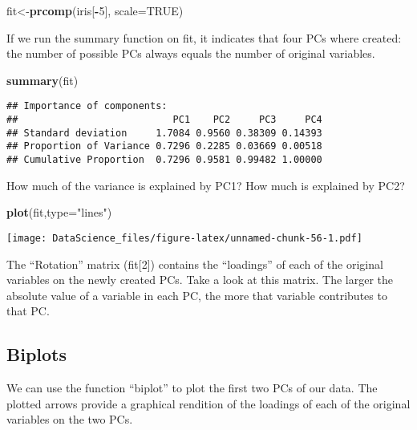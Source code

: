 \documentclass[
]{book}
\newenvironment{Shaded}{\begin{snugshade}}{\end{snugshade}}
\newcommand{\DataTypeTok}[1]{\textcolor[rgb]{0.13,0.29,0.53}{#1}}
\newcommand{\DecValTok}[1]{\textcolor[rgb]{0.00,0.00,0.81}{#1}}
\newcommand{\KeywordTok}[1]{\textcolor[rgb]{0.13,0.29,0.53}{\textbf{#1}}}
\newcommand{\NormalTok}[1]{#1}
\newcommand{\OperatorTok}[1]{\textcolor[rgb]{0.81,0.36,0.00}{\textbf{#1}}}
\newcommand{\OtherTok}[1]{\textcolor[rgb]{0.56,0.35,0.01}{#1}}
\newcommand{\StringTok}[1]{\textcolor[rgb]{0.31,0.60,0.02}{#1}}
\begin{document}
\begin{Shaded}
\begin{Highlighting}[]
\NormalTok{fit\textless{}{-}}\KeywordTok{prcomp}\NormalTok{(iris[}\OperatorTok{{-}}\DecValTok{5}\NormalTok{], }\DataTypeTok{scale=}\OtherTok{TRUE}\NormalTok{)}
\end{Highlighting}
\end{Shaded}

If we run the summary function on fit, it indicates that four PCs where created: the number
of possible PCs always equals the number of original variables.

\begin{Shaded}
\begin{Highlighting}[]
\KeywordTok{summary}\NormalTok{(fit)}
\end{Highlighting}
\end{Shaded}

\begin{verbatim}
## Importance of components:
##                           PC1    PC2     PC3     PC4
## Standard deviation     1.7084 0.9560 0.38309 0.14393
## Proportion of Variance 0.7296 0.2285 0.03669 0.00518
## Cumulative Proportion  0.7296 0.9581 0.99482 1.00000
\end{verbatim}

How much of the variance is explained by PC1? How much is explained by PC2?

\begin{Shaded}
\begin{Highlighting}[]
\KeywordTok{plot}\NormalTok{(fit,}\DataTypeTok{type=}\StringTok{"lines"}\NormalTok{)}
\end{Highlighting}
\end{Shaded}

\texttt{[image: DataScience\_files/figure-latex/unnamed-chunk-56-1.pdf]}

The ``Rotation'' matrix (fit{[}2{]}) contains the ``loadings'' of each of the original variables on the newly created PCs. Take a look at this matrix. The larger the absolute value of a variable in each PC, the more that variable contributes to that PC.

\hypertarget{biplots}{%
\subsection{Biplots}\label{biplots}}

We can use the function ``biplot'' to plot the first two PCs of our data. The plotted arrows provide a graphical rendition of the loadings of each of the original variables on the two PCs.
\end{document}
